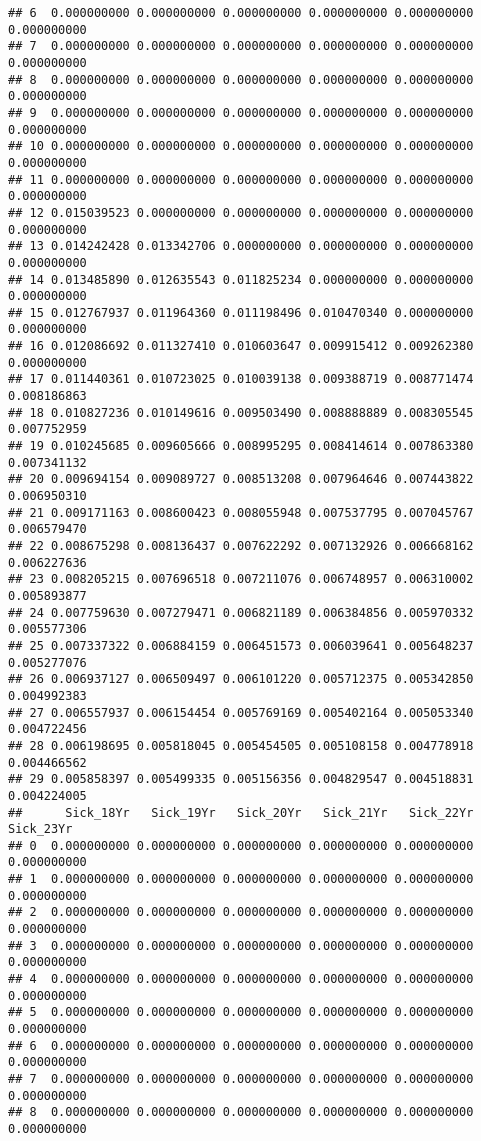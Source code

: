 \documentclass[
]{article}
\begin{document}
\begin{verbatim}
## 6  0.000000000 0.000000000 0.000000000 0.000000000 0.000000000 0.000000000
## 7  0.000000000 0.000000000 0.000000000 0.000000000 0.000000000 0.000000000
## 8  0.000000000 0.000000000 0.000000000 0.000000000 0.000000000 0.000000000
## 9  0.000000000 0.000000000 0.000000000 0.000000000 0.000000000 0.000000000
## 10 0.000000000 0.000000000 0.000000000 0.000000000 0.000000000 0.000000000
## 11 0.000000000 0.000000000 0.000000000 0.000000000 0.000000000 0.000000000
## 12 0.015039523 0.000000000 0.000000000 0.000000000 0.000000000 0.000000000
## 13 0.014242428 0.013342706 0.000000000 0.000000000 0.000000000 0.000000000
## 14 0.013485890 0.012635543 0.011825234 0.000000000 0.000000000 0.000000000
## 15 0.012767937 0.011964360 0.011198496 0.010470340 0.000000000 0.000000000
## 16 0.012086692 0.011327410 0.010603647 0.009915412 0.009262380 0.000000000
## 17 0.011440361 0.010723025 0.010039138 0.009388719 0.008771474 0.008186863
## 18 0.010827236 0.010149616 0.009503490 0.008888889 0.008305545 0.007752959
## 19 0.010245685 0.009605666 0.008995295 0.008414614 0.007863380 0.007341132
## 20 0.009694154 0.009089727 0.008513208 0.007964646 0.007443822 0.006950310
## 21 0.009171163 0.008600423 0.008055948 0.007537795 0.007045767 0.006579470
## 22 0.008675298 0.008136437 0.007622292 0.007132926 0.006668162 0.006227636
## 23 0.008205215 0.007696518 0.007211076 0.006748957 0.006310002 0.005893877
## 24 0.007759630 0.007279471 0.006821189 0.006384856 0.005970332 0.005577306
## 25 0.007337322 0.006884159 0.006451573 0.006039641 0.005648237 0.005277076
## 26 0.006937127 0.006509497 0.006101220 0.005712375 0.005342850 0.004992383
## 27 0.006557937 0.006154454 0.005769169 0.005402164 0.005053340 0.004722456
## 28 0.006198695 0.005818045 0.005454505 0.005108158 0.004778918 0.004466562
## 29 0.005858397 0.005499335 0.005156356 0.004829547 0.004518831 0.004224005
##      Sick_18Yr   Sick_19Yr   Sick_20Yr   Sick_21Yr   Sick_22Yr   Sick_23Yr
## 0  0.000000000 0.000000000 0.000000000 0.000000000 0.000000000 0.000000000
## 1  0.000000000 0.000000000 0.000000000 0.000000000 0.000000000 0.000000000
## 2  0.000000000 0.000000000 0.000000000 0.000000000 0.000000000 0.000000000
## 3  0.000000000 0.000000000 0.000000000 0.000000000 0.000000000 0.000000000
## 4  0.000000000 0.000000000 0.000000000 0.000000000 0.000000000 0.000000000
## 5  0.000000000 0.000000000 0.000000000 0.000000000 0.000000000 0.000000000
## 6  0.000000000 0.000000000 0.000000000 0.000000000 0.000000000 0.000000000
## 7  0.000000000 0.000000000 0.000000000 0.000000000 0.000000000 0.000000000
## 8  0.000000000 0.000000000 0.000000000 0.000000000 0.000000000 0.000000000

\end{verbatim}
\end{document}
